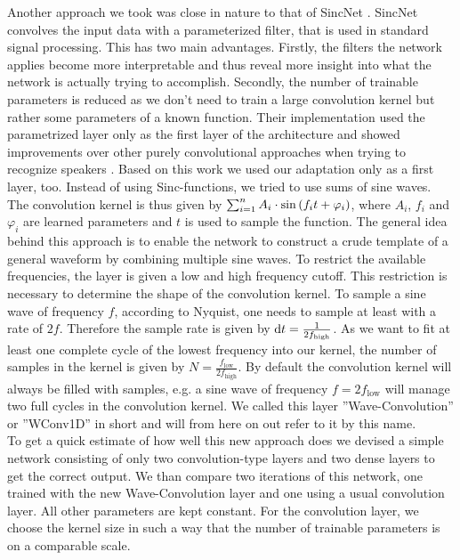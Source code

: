 Another approach we took was close in nature to that of SincNet \cite{sincnet}. SincNet convolves the input data with a parameterized filter, that is used in standard signal processing. This has two main advantages. Firstly, the filters the network applies become more interpretable and thus reveal more insight into what the network is actually trying to accomplish. Secondly, the number of trainable parameters is reduced as we don't need to train a large convolution kernel but rather some parameters of a known function. Their implementation used the parametrized layer only as the first layer of the architecture and showed improvements over other purely convolutional approaches when trying to recognize speakers \cite{sincnet_speach}. Based on this work we used our adaptation only as a first layer, too. Instead of using Sinc-functions, we tried to use sums of sine waves. The convolution kernel is thus given by $\sum_{i=1}^n A_i\cdot\sin{\left( f_i t + \varphi_i \right)}$, where $A_i$, $f_i$ and $\varphi_i$ are learned parameters and $t$ is used to sample the function. The general idea behind this approach is to enable the network to construct a crude template of a general waveform by combining multiple sine waves. To restrict the available frequencies, the layer is given a low and high frequency cutoff. This restriction is necessary to determine the shape of the convolution kernel. To sample a sine wave of frequency $f$, according to Nyquist, one needs to sample at least with a rate of $2f$. Therefore the sample rate is given by $\mathop{}\!\mathrm{d} t = \frac{1}{2 f_\text{high}}$. As we want to fit at least one complete cycle of the lowest frequency into our kernel, the number of samples in the kernel is given by $N=\frac{f_\text{low}}{2f_\text{high}}$. By default the convolution kernel will always be filled with samples, e.g. a sine wave of frequency $f=2f_\text{low}$ will manage two full cycles in the convolution kernel. We called this layer ''Wave-Convolution'' or ''WConv1D'' in short and will from here on out refer to it by this name.\\
To get a quick estimate of how well this new approach does we devised a simple network consisting of only two convolution-type layers and two dense layers to get the correct output. We than compare two iterations of this network, one trained with the new Wave-Convolution layer and one using a usual convolution layer. All other parameters are kept constant. For the convolution layer, we choose the kernel size in such a way that the number of trainable parameters is on a comparable scale.\\
